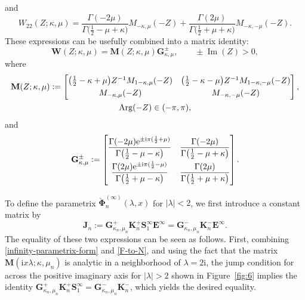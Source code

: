 \documentclass[pdftex]{sigma}
\numberwithin{equation}{section}
\newcommand{\ee}{\mathrm{e}}
\newcommand{\ii}{\mathrm{i}}
\newcommand{\para}[1]{\breve{#1}}
\newcommand{\im}{\operatorname{Im}}
\renewcommand{\arg}{\operatorname{Arg}}
\begin{document}
and
\begin{equation*}
 W_{22}(Z;\kappa,\mu)=\frac{\Gamma(-2\mu)}{\Gamma\big(\frac{1}{2}-\mu+\kappa\big)}M_{-\kappa,\mu}(-Z) +\frac{\Gamma(2\mu)}{\Gamma\big(\frac{1}{2}+\mu+\kappa\big)}M_{-\kappa,-\mu}(-Z).
\end{equation*}
These expressions can be usefully combined into a matrix identity:
\begin{equation}
 \mathbf{W}(Z;\kappa,\mu)=\mathbf{M}(Z;\kappa,\mu)\mathbf{G}^\pm_{\kappa,\mu},\qquad \pm\im(Z)>0,
 \label{F-to-N}
\end{equation}
where
\begin{gather}
 \mathbf{M}(Z;\kappa,\mu):=
 \begin{bmatrix}
 \big(\frac{1}{2}-\kappa+\mu\big)Z^{-1}M_{1-\kappa,\mu}(-Z) & \big(\frac{1}{2}-\kappa-\mu\big)Z^{-1}M_{1-\kappa,-\mu}(-Z)\vspace{1mm}\\
 M_{-\kappa,\mu}(-Z) & M_{-\kappa,-\mu}(-Z)
 \end{bmatrix},\nonumber\\
 \arg(-Z)\in (-\pi,\pi),
 \label{N-define}
\end{gather}
and
\begin{equation*} %
 \mathbf{G}^\pm_{\kappa,\mu}:=\begin{bmatrix}
 \displaystyle \frac{\Gamma(-2\mu)\ee^{\pm \ii\pi(\frac{1}{2}+\mu)}}{\Gamma\big(\frac{1}{2}-\mu-\kappa\big)} &
 \displaystyle \frac{\Gamma(-2\mu)}{\Gamma\big(\frac{1}{2}-\mu+\kappa\big)}\vspace{1mm}\\
 \displaystyle\frac{\Gamma(2\mu)\ee^{\pm \ii\pi(\frac{1}{2}-\mu)}}{\Gamma\big(\frac{1}{2}+\mu-\kappa\big)} &
 \displaystyle \frac{\Gamma(2\mu)}{\Gamma\big(\frac{1}{2}+\mu+\kappa\big)}
 \end{bmatrix}.
\end{equation*}

To define the parametrix $\para{\boldsymbol{\Phi}}_n^{(\infty)}(\lambda,x)$ for $|\lambda|<2$, we first introduce a constant matrix by
\begin{equation}
 \mathbf{J}_n:=\mathbf{G}_{\kappa_n,\mu_n}^+ \mathbf{K}_n^+ \mathbf{S}_1^{\infty} \mathbf{E}^{\infty}=\mathbf{G}_{\kappa_n,\mu_n}^- \mathbf{K}_n^- \mathbf{E}^{\infty}.
\label{eq:M-infty}
\end{equation}
The equality of these two expressions can be seen as follows. First, combining \eqref{infinity-parametrix-form} and \eqref{F-to-N}, and using the fact that the matrix $\mathbf{M}(\ii x\lambda;\kappa,\mu_n)$ is analytic in a neighborhood of $\lambda=2\ii$, the jump condition for \smash{$\para{\mathbf{\Phi}}_n^{(\infty)}(\lambda,x)$} across the positive imaginary axis for $|\lambda|>2$ shown in Figure~\ref{fig:6} implies the identity $\mathbf{G}_{\kappa_n,\mu_n}^+\mathbf{K}_n^+ \mathbf{S}_1^{\infty}=\mathbf{G}_{\kappa_n,\mu_n}^-\mathbf{K}_n^-$, which yields the desired equality.
\end{document}
